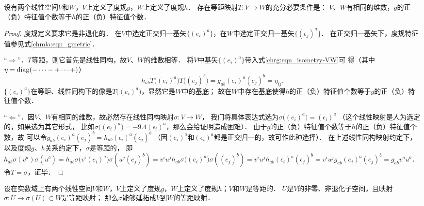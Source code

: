 \begin{proposition}\label{chrg:thm_isometry-VW}
设有两个线性空间$V$和$W$，$V$上定义了度规$g$，$W$上定义了度规$h$．
存在等距映射$T:V\to W$的充分必要条件是：
$V$、$W$有相同的维数，$g$的正（负）特征值个数等于$h$的正（负）特征值个数．    
\end{proposition}
\begin{proof}
        度规定义要求它是非退化的．
    在$V$中选定正交归一基矢$\{(e_i)^a\}$，在$W$中选定正交归一基矢$\{(\epsilon_j)^a\}$．
    在正交归一基矢下，度规特征值参见式\eqref{chmla:eqn_gmetric}．
    
    “$\Rightarrow$”．$T$等距，则它首先是线性同构，故$V$、$W$的维数相等．
    将$V$中基矢$\{(e_i)^a\}$带入式\eqref{chrg:eqn_isometry-VW}可
    得（其中$\eta={\rm diag}(-\cdots -+\cdots +)$）
    \begin{equation}
         h_{ab} T\bigl((e_i)^a\bigr) T\bigl((e_j)^b\bigr) = g_{ab} (e_i)^a(e_j)^b = \eta_{ij} .
    \end{equation}
    $\{(e_i)^a\}$在等距、线性同构下的像是$T\bigl((e_i)^a\bigr)$，显然它是$W$中的基底；
    故在$W$中存在基底使得$h$的正（负）特征值个数等于$g$的正（负）特征值个数．  
    
    “$\Leftarrow$”．因$V$、$W$有相同的维数，故必然存在线性同构映射$\sigma:V\to W$，
    我们将具体表达式选为$\sigma\bigl((e_i)^a\bigr) = (\epsilon_i)^a$
    （这个线性映射是人为选定的，如果选为其它形式，
    比如$\sigma\bigl((e_i)^a\bigr) =-9.4 (\epsilon_i)^a$，那么会给证明造成困难）．
    由于$g$的正（负）特征值个数等于$h$的正（负）特征值个数，故
    可以令$g_{ab}(e_i)^a(e_j)^b = h_{ab}(\epsilon_i)^a(\epsilon_j)^b$
    （因$(e_i)^a$和$(\epsilon_i)^a$都是正交归一的，故可作此种选择）．
    在上述线性同构映射约定下，以及度规$g$、$h$关系约定下，$\sigma$是等距的，
    即$h_{ab} \sigma(v^a) \sigma(u^b)=h_{ab} \sigma\bigl(v^i(e_i)^a\bigr) \sigma(u^j(e_j)^b)
    =v^i u^j h_{ab} \sigma\bigl((e_i)^a\bigr) \sigma((e_j)^b) 
    =v^i u^j h_{ab} (\epsilon_i)^a (\epsilon_j)^b 
    =v^i u^j g_{ab} (e_i)^a (e_j)^b  = g_{ab}v^a u^b$．
    令$T=\sigma$，证毕．
\end{proof}



\begin{theorem}\label{chmla:thm_Witt-isometry}
    设在实数域上有两个线性空间$V$和$W$，$V$上定义了度规$g$，$W$上定义了度规$h$；$V$和$W$是等距的．
    $U$是$V$的非零、非退化子空间，且映射$\sigma:U\to \sigma(U)\subset W$是等距映射；
    那么$\sigma$能够延拓成$V$到$W$的等距映射．    
\end{theorem}

